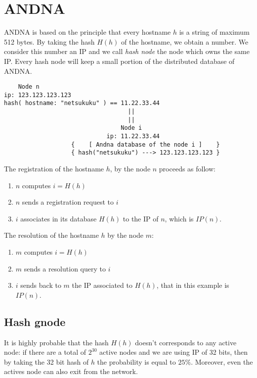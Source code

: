 \documentclass[a4paper]{article}
\begin{document}
\section{ANDNA}
  
ANDNA is based on the principle that every hostname $h$ is a string of maximum
512 bytes. By taking the hash $H(h)$ of the hostname, we obtain a number.
We consider this number an IP and we call \emph{hash node} the node which owns
the same IP. Every hash node will keep a small portion of the distributed
database of ANDNA.\\

\begin{verbatim}            
    Node n
ip: 123.123.123.123
hash( hostname: "netsukuku" ) == 11.22.33.44
                                   ||
                                   ||
                                 Node i
                             ip: 11.22.33.44
                   {    [ Andna database of the node i ]    }
                   { hash("netsukuku") ---> 123.123.123.123 }
\end{verbatim}

The registration of the hostname $h$, by the node $n$ proceeds as follow:
\begin{enumerate}
	\item $n$ computes $i=H(h)$
	\item $n$ sends a registration request to $i$
	\item $i$ associates in its database $H(h)$ to the IP of $n$, which is
		$IP(n)$.
\end{enumerate}
The resolution of the hostname $h$ by the node $m$:
\begin{enumerate}
	\item $m$ computes $i=H(h)$
	\item $m$ sends a resolution query to $i$
	\item $i$ sends back to $m$ the IP associated to $H(h)$, that in this
		example is $IP(n)$.
\end{enumerate}


\subsection{Hash gnode}
It is highly probable that the hash $H(h)$ doesn't corresponds to any active
node: if there are a total of $2^{30}$ active nodes and we are using IP of 32
bits, then by taking the 32 bit hash of $h$ the probability is equal to
$25\%$. Moreover, even the actives node can also exit from the network.
\end{document}
